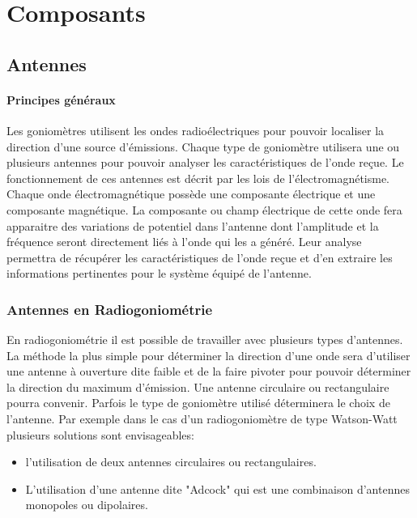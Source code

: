 \chapter{Composants}


\section{Antennes}

\subsubsection{Principes généraux}

	Les goniomètres utilisent les ondes radioélectriques pour pouvoir localiser la direction d'une source d'émissions. Chaque type de goniomètre utilisera une ou plusieurs antennes pour pouvoir analyser les caractéristiques de l'onde reçue. 
	Le fonctionnement de ces antennes est décrit par les lois de l'électromagnétisme. Chaque onde électromagnétique possède une composante électrique et une composante magnétique. La composante ou champ électrique de cette onde fera apparaitre des variations de potentiel dans l'antenne dont l'amplitude et la fréquence seront directement liés à l'onde qui les a généré. Leur analyse permettra de récupérer les caractéristiques de l'onde reçue et d'en extraire les informations pertinentes pour le système équipé de l'antenne.
	
\subsection{Antennes en Radiogoniométrie}

	En radiogoniométrie il est possible de travailler avec plusieurs types d'antennes. La méthode la plus simple pour déterminer la direction d'une onde sera d'utiliser une antenne à ouverture dite faible et de la faire pivoter pour pouvoir déterminer la direction du maximum d'émission. Une antenne circulaire ou rectangulaire pourra convenir. Parfois le type de goniomètre utilisé déterminera le choix de l'antenne. Par exemple dans le cas d'un radiogoniomètre de type Watson-Watt plusieurs solutions sont envisageables: 
	
\begin{itemize}

\item l'utilisation de deux antennes circulaires ou rectangulaires.

\item L'utilisation d'une antenne dite "Adcock" qui est une combinaison d'antennes monopoles ou dipolaires. 

\end{itemize} 

